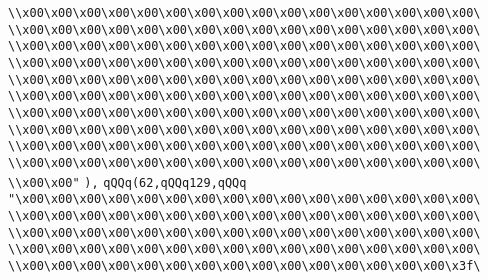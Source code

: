 \verb|\\x00\x00\x00\x00\x00\x00\x00\x00\x00\x00\x00\x00\x00\x00\x00\x00\|\newline
\verb|\\x00\x00\x00\x00\x00\x00\x00\x00\x00\x00\x00\x00\x00\x00\x00\x00\|\newline
\verb|\\x00\x00\x00\x00\x00\x00\x00\x00\x00\x00\x00\x00\x00\x00\x00\x00\|\newline
\verb|\\x00\x00\x00\x00\x00\x00\x00\x00\x00\x00\x00\x00\x00\x00\x00\x00\|\newline
\verb|\\x00\x00\x00\x00\x00\x00\x00\x00\x00\x00\x00\x00\x00\x00\x00\x00\|\newline
\verb|\\x00\x00\x00\x00\x00\x00\x00\x00\x00\x00\x00\x00\x00\x00\x00\x00\|\newline
\verb|\\x00\x00\x00\x00\x00\x00\x00\x00\x00\x00\x00\x00\x00\x00\x00\x00\|\newline
\verb|\\x00\x00\x00\x00\x00\x00\x00\x00\x00\x00\x00\x00\x00\x00\x00\x00\|\newline
\verb|\\x00\x00\x00\x00\x00\x00\x00\x00\x00\x00\x00\x00\x00\x00\x00\x00\|\newline
\verb|\\x00\x00\x00\x00\x00\x00\x00\x00\x00\x00\x00\x00\x00\x00\x00\x00\|\newline
\verb|\\x00\x00"|\newline
\verb|),|\newline
\verb|qQQq(62,qQQq129,qQQq|\newline
\verb|"\x00\x00\x00\x00\x00\x00\x00\x00\x00\x00\x00\x00\x00\x00\x00\x00\|\newline
\verb|\\x00\x00\x00\x00\x00\x00\x00\x00\x00\x00\x00\x00\x00\x00\x00\x00\|\newline
\verb|\\x00\x00\x00\x00\x00\x00\x00\x00\x00\x00\x00\x00\x00\x00\x00\x00\|\newline
\verb|\\x00\x00\x00\x00\x00\x00\x00\x00\x00\x00\x00\x00\x00\x00\x00\x00\|\newline
\verb|\\x00\x00\x00\x00\x00\x00\x00\x00\x00\x00\x00\x00\x00\x00\x00\x3f\|\newline
